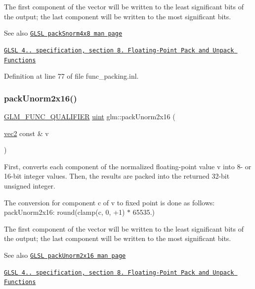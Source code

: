 The first component of the vector will be written to the least significant bits of the output; the last component will be written to the most significant bits.

\begin{DoxySeeAlso}{See also}
\href{http://www.opengl.org/sdk/docs/manglsl/xhtml/packSnorm4x8.xml}{\tt G\+L\+SL pack\+Snorm4x8 man page} 

\href{http://www.opengl.org/registry/doc/GLSLangSpec.4.20.8.pdf}{\tt G\+L\+SL 4.. specification, section 8. Floating-\/\+Point Pack and Unpack Functions} 
\end{DoxySeeAlso}


Definition at line 77 of file func\+\_\+packing.\+inl.

\mbox{\label{group__core__func__packing_ga0659ddaf09727551c7bf51655d2a65cf}} 
\subsubsection{\texorpdfstring{pack\+Unorm2x16()}{packUnorm2x16()}}
{\footnotesize\ttfamily \hyperlink{setup_8hpp_a33fdea6f91c5f834105f7415e2a64407}{G\+L\+M\+\_\+\+F\+U\+N\+C\+\_\+\+Q\+U\+A\+L\+I\+F\+I\+ER} \hyperlink{group__core__precision_ga4fd29415871152bfb5abd588334147c8}{uint} glm\+::pack\+Unorm2x16 (\begin{DoxyParamCaption}\item[{\hyperlink{group__core__types_gaa1618f51db67eaa145db101d8c8431d8}{vec2} const \&}]{v }\end{DoxyParamCaption})}

First, converts each component of the normalized floating-\/point value v into 8-\/ or 16-\/bit integer values. Then, the results are packed into the returned 32-\/bit unsigned integer.

The conversion for component c of v to fixed point is done as follows\+: pack\+Unorm2x16\+: round(clamp(c, 0, +1) $\ast$ 65535.)

The first component of the vector will be written to the least significant bits of the output; the last component will be written to the most significant bits.

\begin{DoxySeeAlso}{See also}
\href{http://www.opengl.org/sdk/docs/manglsl/xhtml/packUnorm2x16.xml}{\tt G\+L\+SL pack\+Unorm2x16 man page} 

\href{http://www.opengl.org/registry/doc/GLSLangSpec.4.20.8.pdf}{\tt G\+L\+SL 4.. specification, section 8. Floating-\/\+Point Pack and Unpack Functions} 
\end{DoxySeeAlso}


